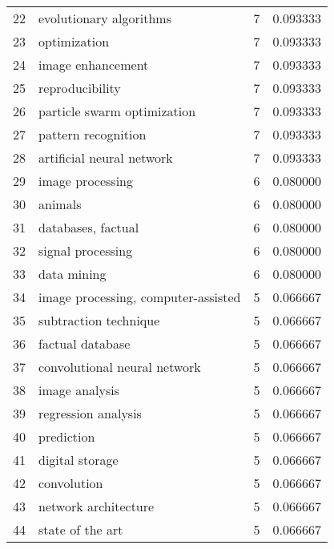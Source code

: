 \begin{tabular}{llrr}
22 &                  evolutionary algorithms &           7 &    0.093333 \\
23 &                             optimization &           7 &    0.093333 \\
24 &                        image enhancement &           7 &    0.093333 \\
25 &                          reproducibility &           7 &    0.093333 \\
26 &              particle swarm optimization &           7 &    0.093333 \\
27 &                      pattern recognition &           7 &    0.093333 \\
28 &                artificial neural network &           7 &    0.093333 \\
29 &                         image processing &           6 &    0.080000 \\
30 &                                  animals &           6 &    0.080000 \\
31 &                       databases, factual &           6 &    0.080000 \\
32 &                        signal processing &           6 &    0.080000 \\
33 &                              data mining &           6 &    0.080000 \\
34 &      image processing, computer-assisted &           5 &    0.066667 \\
35 &                    subtraction technique &           5 &    0.066667 \\
36 &                         factual database &           5 &    0.066667 \\
37 &             convolutional neural network &           5 &    0.066667 \\
38 &                           image analysis &           5 &    0.066667 \\
39 &                      regression analysis &           5 &    0.066667 \\
40 &                               prediction &           5 &    0.066667 \\
41 &                          digital storage &           5 &    0.066667 \\
42 &                              convolution &           5 &    0.066667 \\
43 &                     network architecture &           5 &    0.066667 \\
44 &                         state of the art &           5 &    0.066667 \\

\end{tabular}
